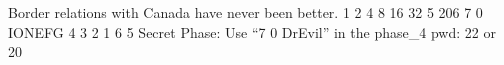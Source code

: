 Border relations with Canada have never been better.
1 2 4 8 16 32
5 206
7 0 
IONEFG
4 3 2 1 6 5
Secret Phase: Use “7 0 DrEvil” in the phase_4 pwd: 22 or 20